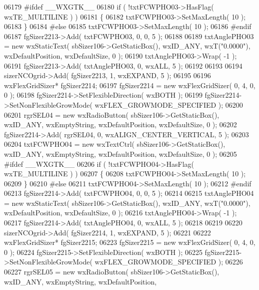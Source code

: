 \begin{DoxyCode}
06179 \textcolor{preprocessor}{    #ifdef \_\_WXGTK\_\_}
06180     \textcolor{keywordflow}{if} ( !txtFCWPHO03->HasFlag( wxTE\_MULTILINE ) )
06181     \{
06182     txtFCWPHO03->SetMaxLength( 10 );
06183     \}
06184 \textcolor{preprocessor}{    #else}
06185     txtFCWPHO03->SetMaxLength( 10 );
06186 \textcolor{preprocessor}{    #endif}
06187     fgSizer2213->Add( txtFCWPHO03, 0, 0, 5 );
06188     
06189     txtAnglePHO03 = \textcolor{keyword}{new} wxStaticText( sbSizer106->GetStaticBox(), wxID\_ANY, wxT(\textcolor{stringliteral}{"0.0000"}), 
      wxDefaultPosition, wxDefaultSize, 0 );
06190     txtAnglePHO03->Wrap( -1 );
06191     fgSizer2213->Add( txtAnglePHO03, 0, wxALL, 5 );
06192     
06193     
06194     sizerNCOgrid->Add( fgSizer2213, 1, wxEXPAND, 5 );
06195     
06196     wxFlexGridSizer* fgSizer2214;
06197     fgSizer2214 = \textcolor{keyword}{new} wxFlexGridSizer( 0, 4, 0, 0 );
06198     fgSizer2214->SetFlexibleDirection( wxBOTH );
06199     fgSizer2214->SetNonFlexibleGrowMode( wxFLEX\_GROWMODE\_SPECIFIED );
06200     
06201     rgrSEL04 = \textcolor{keyword}{new} wxRadioButton( sbSizer106->GetStaticBox(), wxID\_ANY, wxEmptyString, wxDefaultPosition, 
      wxDefaultSize, 0 );
06202     fgSizer2214->Add( rgrSEL04, 0, wxALIGN\_CENTER\_VERTICAL, 5 );
06203     
06204     txtFCWPHO04 = \textcolor{keyword}{new} wxTextCtrl( sbSizer106->GetStaticBox(), wxID\_ANY, wxEmptyString, wxDefaultPosition, 
      wxDefaultSize, 0 );
06205 \textcolor{preprocessor}{    #ifdef \_\_WXGTK\_\_}
06206     \textcolor{keywordflow}{if} ( !txtFCWPHO04->HasFlag( wxTE\_MULTILINE ) )
06207     \{
06208     txtFCWPHO04->SetMaxLength( 10 );
06209     \}
06210 \textcolor{preprocessor}{    #else}
06211     txtFCWPHO04->SetMaxLength( 10 );
06212 \textcolor{preprocessor}{    #endif}
06213     fgSizer2214->Add( txtFCWPHO04, 0, 0, 5 );
06214     
06215     txtAnglePHO04 = \textcolor{keyword}{new} wxStaticText( sbSizer106->GetStaticBox(), wxID\_ANY, wxT(\textcolor{stringliteral}{"0.0000"}), 
      wxDefaultPosition, wxDefaultSize, 0 );
06216     txtAnglePHO04->Wrap( -1 );
06217     fgSizer2214->Add( txtAnglePHO04, 0, wxALL, 5 );
06218     
06219     
06220     sizerNCOgrid->Add( fgSizer2214, 1, wxEXPAND, 5 );
06221     
06222     wxFlexGridSizer* fgSizer2215;
06223     fgSizer2215 = \textcolor{keyword}{new} wxFlexGridSizer( 0, 4, 0, 0 );
06224     fgSizer2215->SetFlexibleDirection( wxBOTH );
06225     fgSizer2215->SetNonFlexibleGrowMode( wxFLEX\_GROWMODE\_SPECIFIED );
06226     
06227     rgrSEL05 = \textcolor{keyword}{new} wxRadioButton( sbSizer106->GetStaticBox(), wxID\_ANY, wxEmptyString, wxDefaultPosition, 

\end{DoxyCode}
